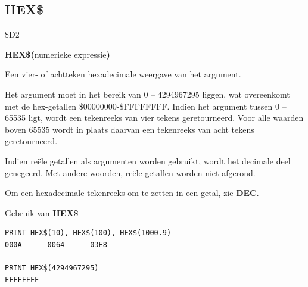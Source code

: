 \subsection{HEX\$}
\begin{description}[leftmargin=2cm,style=nextline]
\item [Token:]    \$D2

\item [Formaat:]   {\bf HEX\$(}numerieke expressie{\bf)}

\item [Retourneert:]  Een vier- of achtteken hexadecimale weergave van het argument.

                  Het argument moet in het bereik van 0 -- 4294967295 liggen, wat overeenkomt met de hex-getallen \$00000000-\$FFFFFFFF. Indien het argument tussen 0 -- 65535 ligt, wordt een tekenreeks van vier tekens geretourneerd. Voor alle waarden boven 65535 wordt in plaats daarvan een tekenreeks van acht tekens geretourneerd.

\item [Opmerkingen:]  Indien reële getallen als argumenten worden gebruikt, wordt het decimale deel genegeerd. Met andere woorden, reële getallen worden niet afgerond.

                  Om een hexadecimale tekenreeks om te zetten in een getal, zie {\bf DEC}.

\item [Voorbeelden:] Gebruik van {\bf HEX\$}

\begin{tcolorbox}[colback=black,coltext=white]
\verbatimfont{\codefont}
\begin{verbatim}
PRINT HEX$(10), HEX$(100), HEX$(1000.9)
000A      0064      03E8

PRINT HEX$(4294967295)
FFFFFFFF
\end{verbatim}
\end{tcolorbox}
\end{description}


\newpage
